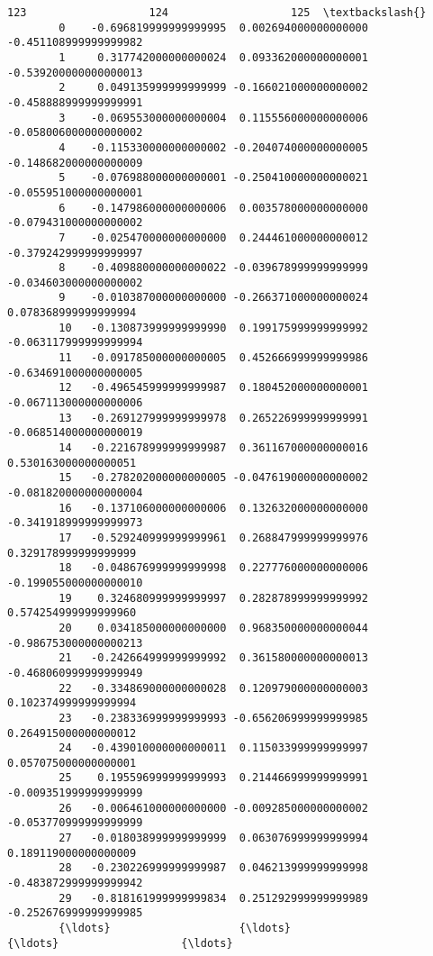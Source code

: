 \documentclass[11pt]{article}
\begin{document}
\begin{Verbatim}[commandchars=\\\{\}]
                               123                   124                   125  \textbackslash{}
        0    -0.696819999999999995  0.002694000000000000 -0.451108999999999982   
        1     0.317742000000000024  0.093362000000000001 -0.539200000000000013   
        2     0.049135999999999999 -0.166021000000000002 -0.458888999999999991   
        3    -0.069553000000000004  0.115556000000000006 -0.058006000000000002   
        4    -0.115330000000000002 -0.204074000000000005 -0.148682000000000009   
        5    -0.076988000000000001 -0.250410000000000021 -0.055951000000000001   
        6    -0.147986000000000006  0.003578000000000000 -0.079431000000000002   
        7    -0.025470000000000000  0.244461000000000012 -0.379242999999999997   
        8    -0.409880000000000022 -0.039678999999999999 -0.034603000000000002   
        9    -0.010387000000000000 -0.266371000000000024  0.078368999999999994   
        10   -0.130873999999999990  0.199175999999999992 -0.063117999999999994   
        11   -0.091785000000000005  0.452666999999999986 -0.634691000000000005   
        12   -0.496545999999999987  0.180452000000000001 -0.067113000000000006   
        13   -0.269127999999999978  0.265226999999999991 -0.068514000000000019   
        14   -0.221678999999999987  0.361167000000000016  0.530163000000000051   
        15   -0.278202000000000005 -0.047619000000000002 -0.081820000000000004   
        16   -0.137106000000000006  0.132632000000000000 -0.341918999999999973   
        17   -0.529240999999999961  0.268847999999999976  0.329178999999999999   
        18   -0.048676999999999998  0.227776000000000006 -0.199055000000000010   
        19    0.324680999999999997  0.282878999999999992  0.574254999999999960   
        20    0.034185000000000000  0.968350000000000044 -0.986753000000000213   
        21   -0.242664999999999992  0.361580000000000013 -0.468060999999999949   
        22   -0.334869000000000028  0.120979000000000003  0.102374999999999994   
        23   -0.238336999999999993 -0.656206999999999985  0.264915000000000012   
        24   -0.439010000000000011  0.115033999999999997  0.057075000000000001   
        25    0.195596999999999993  0.214466999999999991 -0.009351999999999999   
        26   -0.006461000000000000 -0.009285000000000002 -0.053770999999999999   
        27   -0.018038999999999999  0.063076999999999994  0.189119000000000009   
        28   -0.230226999999999987  0.046213999999999998 -0.483872999999999942   
        29   -0.818161999999999834  0.251292999999999989 -0.252676999999999985   
        {\ldots}                    {\ldots}                   {\ldots}                   {\ldots}   

\end{Verbatim}
\end{document}
